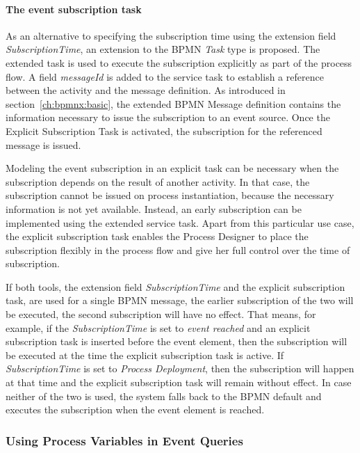 \paragraph{The event subscription task}
As an alternative to specifying the subscription time using the extension field \textit{SubscriptionTime}, an extension to the BPMN \textit{Task} type is proposed. 
The extended task is used to execute the subscription explicitly as part of the process flow.
A field \textit{messageId} is added to the service task to establish a reference between the activity and the message definition.
As introduced in section~\autoref{ch:bpmnx:basic}, the extended BPMN Message definition contains the information necessary to issue the subscription to an event source.
Once the Explicit Subscription Task is activated, the subscription for the referenced message is issued. 

Modeling the event subscription in an explicit task can be necessary when the subscription depends on the result of another activity. In that case, the subscription cannot be issued on process instantiation, because the necessary information is not yet available. Instead, an early subscription can be implemented using the extended service task.
Apart from this particular use case, the explicit subscription task enables the Process Designer to place the subscription flexibly in the process flow and give her full control over the time of subscription.

If both tools, the extension field \textit{SubscriptionTime} and the explicit subscription task, are used for a single BPMN message, the earlier subscription of the two will be executed, the second subscription will have no effect.
That means, for example, if the \textit{SubscriptionTime} is set to \textit{event reached} and an explicit subscription task is inserted before the event element, then the subscription will be executed at the time the explicit subscription task is active.
If \textit{SubscriptionTime} is set to \textit{Process Deployment}, then the subscription will happen at that time and the explicit subscription task will remain without effect.
In case neither of the two is used, the system falls back to the BPMN default and executes the subscription when the event element is reached.

\subsubsection{Using Process Variables in Event Queries}\label{ch:bpmnx:variables-in-queries}

